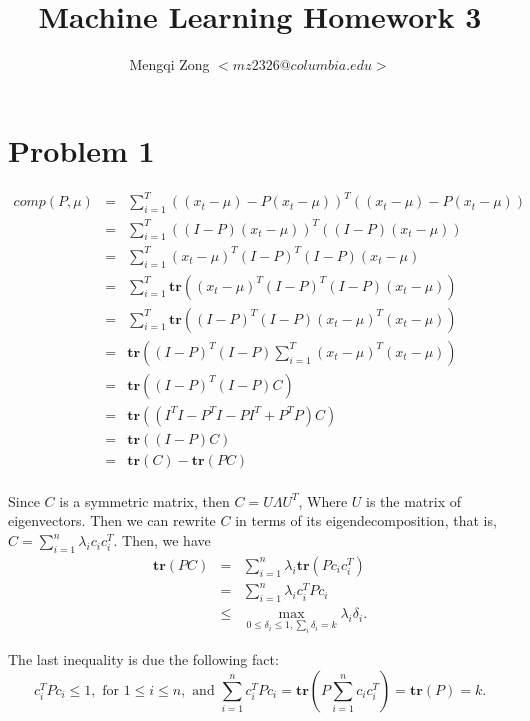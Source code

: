 \documentclass[12pt]{article}
\title{Machine Learning Homework 3}
\author{Mengqi Zong $<mz2326@columbia.edu>$}
\begin{document}
\maketitle

\setlength{\parindent}{0in}

\section*{Problem 1}

\begin{eqnarray*}
comp(P, \mu)
&=& \sum_{i=1}^T \left( (x_t - \mu) - P(x_t - \mu) \right)^T
  \left( (x_t - \mu) - P(x_t - \mu) \right) \\
&=& \sum_{i=1}^T \left( (I-P)(x_t - \mu) \right)^T
  \left( (I-P) (x_t - \mu) \right) \\
&=& \sum_{i=1}^T (x_t - \mu)^T (I-P)^T (I-P) (x_t - \mu) \\
&=& \sum_{i=1}^T \textbf{tr} \left( (x_t - \mu)^T (I-P)^T (I-P)
  (x_t - \mu) \right) \\
&=& \sum_{i=1}^T \textbf{tr} \left( (I-P)^T (I-P) (x_t - \mu)^T
  (x_t - \mu) \right) \\
&=& \textbf{tr} \left( (I-P)^T (I-P) \sum_{i=1}^T (x_t - \mu)^T
  (x_t - \mu) \right) \\
&=& \textbf{tr} \left( (I-P)^T (I-P) C \right) \\
&=& \textbf{tr} \left( (I^T I - P^T I - P I^T + P^TP) C \right) \\
&=& \textbf{tr} \left( (I - P) C \right) \\
&=& \textbf{tr} (C) - \textbf{tr} (PC) \\
\end{eqnarray*}

Since $C$ is a symmetric matrix, then $C = U \Lambda U^T$, Where $U$ is the matrix of eigenvectors. Then we can rewrite $C$ in terms of its eigendecomposition, that is,  $C = \sum_{i=1}^n \lambda_i c_i c_i^T$. Then, we have
\begin{eqnarray*}
  \textbf{tr}(PC)
  &=& \sum_{i=1}^n \lambda_i \textbf{tr}(P c_i c_i^T) \\
  &=& \sum_{i=1}^n \lambda_i c_i^T P c_i  \\
  &\le& \max_{0 \le \delta_i \le 1, \sum_i \delta_i = k} \lambda_i \delta_i.
\end{eqnarray*}

The last inequality is due the following fact:
\begin{equation*}
  c_i^T P c_i \le 1, \text{ for } 1 \le i \le n, \text{ and }
  \sum_{i=1}^{n} c_i^T P c_i = \textbf{tr} \left( P \sum_{i=1}^{n}
    c_i c_i^T \right) = \textbf{tr}(P) = k.
\end{equation*}
\end{document}
